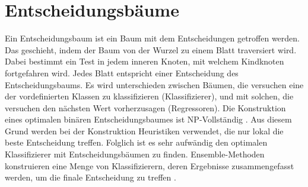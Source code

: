 \chapter{Entscheidungsbäume}
Ein Entscheidungsbaum ist ein Baum mit dem Entscheidungen getroffen werden. Das geschieht, indem der Baum von der Wurzel zu einem Blatt traversiert wird. Dabei bestimmt ein Test in jedem inneren Knoten,
mit welchem Kindknoten fortgefahren wird. Jedes Blatt entspricht einer Entscheidung des Entscheidungsbaums. Es wird unterschieden zwischen Bäumen, die versuchen eine der vordefinierten Klassen zu
klassifizieren (Klassifizierer), und mit solchen, die versuchen den nächsten Wert vorherzusagen (Regressoren).
\newline
\newline
Die Konstruktion eines optimalen binären Entscheidungsbaumes ist NP-Vollständig \cite{laurent1976constructing}. Aus diesem Grund werden bei der Konstruktion
Heuristiken verwendet, die nur lokal die beste Entscheidung treffen. Folglich ist es sehr aufwändig den optimalen Klassifizierer mit Entscheidungsbäumen zu finden. Ensemble-Methoden konstruieren eine Menge von
Klassifizierern, deren Ergebnisse zusammengefasst werden, um die finale Entscheidung zu treffen \cite{dietterich2002ensemble}.



